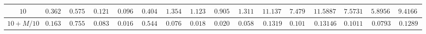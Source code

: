 \begin{landscape}
\begin{tabular}{|c|c|c|c|c|c|c|c|c|c|c|c|c|c|c|c}
$10$         & $0.3628$                                                        & $0.5754$                                                        & $0.1213$                                                          & $0.0960$                                                           & $0.4044$                                                              & $1.3545$                                                        & $1.1233$                                                          & $0.9054$                                                           & $1.3113$                                                              & $11.1377$                                                       & $7.4798$                                                          & $11.58878$                                                       & $7.57318$                                                          & $5.89565$                                                           & \multicolumn{1}{c|}{$9.41665$}                                                              \\ \hline
$10 + M/10$  & $0.1635$                                                        & $0.7556$                                                        & $0.0837$                                                          & $0.0168$                                                           & $0.5449$                                                              & $0.0764$                                                        & $0.0180$                                                          & $0.0204$                                                           & $0.0589$                                                              & $0.1319$                                                        & $0.1015$                                                          & $0.13146$                                                        & $0.10117$                                                          & $0.0793$                                                           & \multicolumn{1}{c|}{$0.1289$}                                                              \\ \hline

\end{tabular}
\end{landscape}

